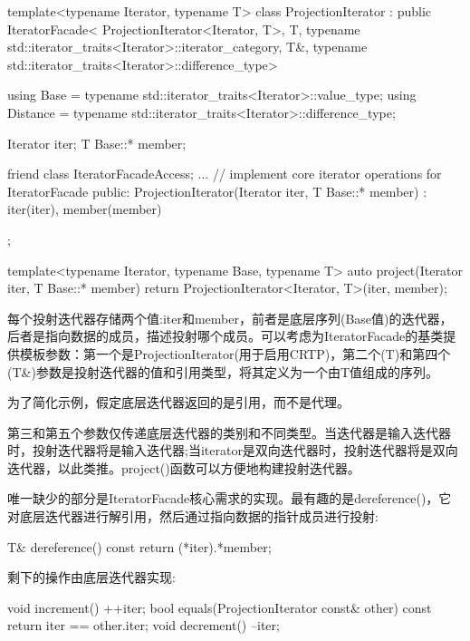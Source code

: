 \begin{cpp}
template<typename Iterator, typename T>
class ProjectionIterator
	: public IteratorFacade<
			ProjectionIterator<Iterator, T>,
			T,
			typename std::iterator_traits<Iterator>::iterator_category,
			T&,
			typename std::iterator_traits<Iterator>::difference_type>
{
	using Base = typename std::iterator_traits<Iterator>::value_type;
	using Distance =
		typename std::iterator_traits<Iterator>::difference_type;
	
	Iterator iter;
	T Base::* member;
	
	friend class IteratorFacadeAccess;
	... // implement core iterator operations for IteratorFacade
	public:
	ProjectionIterator(Iterator iter, T Base::* member)
		: iter(iter), member(member) { }
};

template<typename Iterator, typename Base, typename T>
auto project(Iterator iter, T Base::* member) {
	return ProjectionIterator<Iterator, T>(iter, member);
}
\end{cpp}

每个投射迭代器存储两个值:iter和member，前者是底层序列(Base值)的迭代器，后者是指向数据的成员，描述投射哪个成员。可以考虑为IteratorFacade的基类提供模板参数：第一个是ProjectionIterator(用于启用CRTP)，第二个(T)和第四个(T\&)参数是投射迭代器的值和引用类型，将其定义为一个由T值组成的序列。

\begin{notice}
为了简化示例，假定底层迭代器返回的是引用，而不是代理。
\end{notice}

第三和第五个参数仅传递底层迭代器的类别和不同类型。当迭代器是输入迭代器时，投射迭代器将是输入迭代器;当iterator是双向迭代器时，投射迭代器将是双向迭代器，以此类推。project()函数可以方便地构建投射迭代器。

唯一缺少的部分是IteratorFacade核心需求的实现。最有趣的是dereference()，它对底层迭代器进行解引用，然后通过指向数据的指针成员进行投射:

\begin{cpp}
T& dereference() const {
	return (*iter).*member;
}
\end{cpp}

剩下的操作由底层迭代器实现:

\begin{cpp}
void increment() {
	++iter;
}
bool equals(ProjectionIterator const& other) const {
	return iter == other.iter;
}
void decrement() {
	--iter;
}
\end{cpp}

